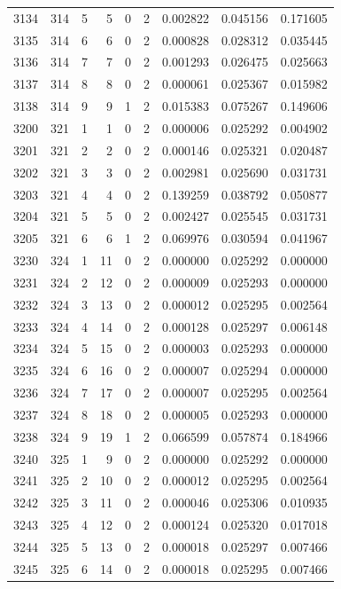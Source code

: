 \begin{longtable}{rrrrrrrrr}
3134 & 314 & 5 & 5 & 0 & 2 & 0.002822 & 0.045156 & 0.171605 \\
3135 & 314 & 6 & 6 & 0 & 2 & 0.000828 & 0.028312 & 0.035445 \\
3136 & 314 & 7 & 7 & 0 & 2 & 0.001293 & 0.026475 & 0.025663 \\
3137 & 314 & 8 & 8 & 0 & 2 & 0.000061 & 0.025367 & 0.015982 \\
3138 & 314 & 9 & 9 & 1 & 2 & 0.015383 & 0.075267 & 0.149606 \\
3200 & 321 & 1 & 1 & 0 & 2 & 0.000006 & 0.025292 & 0.004902 \\
3201 & 321 & 2 & 2 & 0 & 2 & 0.000146 & 0.025321 & 0.020487 \\
3202 & 321 & 3 & 3 & 0 & 2 & 0.002981 & 0.025690 & 0.031731 \\
3203 & 321 & 4 & 4 & 0 & 2 & 0.139259 & 0.038792 & 0.050877 \\
3204 & 321 & 5 & 5 & 0 & 2 & 0.002427 & 0.025545 & 0.031731 \\
3205 & 321 & 6 & 6 & 1 & 2 & 0.069976 & 0.030594 & 0.041967 \\
3230 & 324 & 1 & 11 & 0 & 2 & 0.000000 & 0.025292 & 0.000000 \\
3231 & 324 & 2 & 12 & 0 & 2 & 0.000009 & 0.025293 & 0.000000 \\
3232 & 324 & 3 & 13 & 0 & 2 & 0.000012 & 0.025295 & 0.002564 \\
3233 & 324 & 4 & 14 & 0 & 2 & 0.000128 & 0.025297 & 0.006148 \\
3234 & 324 & 5 & 15 & 0 & 2 & 0.000003 & 0.025293 & 0.000000 \\
3235 & 324 & 6 & 16 & 0 & 2 & 0.000007 & 0.025294 & 0.000000 \\
3236 & 324 & 7 & 17 & 0 & 2 & 0.000007 & 0.025295 & 0.002564 \\
3237 & 324 & 8 & 18 & 0 & 2 & 0.000005 & 0.025293 & 0.000000 \\
3238 & 324 & 9 & 19 & 1 & 2 & 0.066599 & 0.057874 & 0.184966 \\
3240 & 325 & 1 & 9 & 0 & 2 & 0.000000 & 0.025292 & 0.000000 \\
3241 & 325 & 2 & 10 & 0 & 2 & 0.000012 & 0.025295 & 0.002564 \\
3242 & 325 & 3 & 11 & 0 & 2 & 0.000046 & 0.025306 & 0.010935 \\
3243 & 325 & 4 & 12 & 0 & 2 & 0.000124 & 0.025320 & 0.017018 \\
3244 & 325 & 5 & 13 & 0 & 2 & 0.000018 & 0.025297 & 0.007466 \\
3245 & 325 & 6 & 14 & 0 & 2 & 0.000018 & 0.025295 & 0.007466 \\

\end{longtable}
